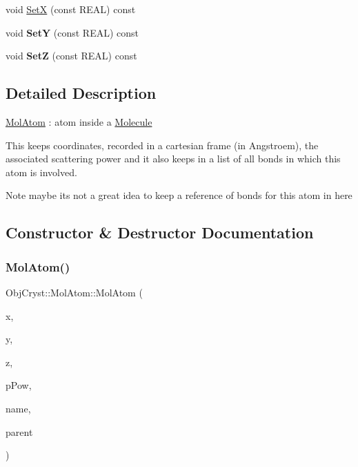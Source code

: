 \begin{DoxyCompactItemize}
\item 
void \mbox{\hyperlink{class_obj_cryst_1_1_mol_atom_a95340ae3d8e3d061a9c28911d471912d}{SetX}} (const R\+E\+AL) const
\item 
\mbox{\label{class_obj_cryst_1_1_mol_atom_a80d9c41c4a6de3a14a02f5f8337df8ad}} 
void {\bfseries SetY} (const R\+E\+AL) const
\item 
\mbox{\label{class_obj_cryst_1_1_mol_atom_aa2299a9315633ee287eac6ae2f953c86}} 
void {\bfseries SetZ} (const R\+E\+AL) const
\end{DoxyCompactItemize}



\subsection{Detailed Description}
\mbox{\hyperlink{class_obj_cryst_1_1_mol_atom}{Mol\+Atom}} \+: atom inside a \mbox{\hyperlink{class_obj_cryst_1_1_molecule}{Molecule}}

This keeps coordinates, recorded in a cartesian frame (in Angstroem), the associated scattering power and it also keeps in a list of all bonds in which this atom is involved.

\begin{DoxyNote}{Note}
maybe it\textquotesingle{}s not a great idea to keep a reference of bonds for this atom in here 
\end{DoxyNote}


\subsection{Constructor \& Destructor Documentation}
\mbox{\label{class_obj_cryst_1_1_mol_atom_a4a96ce5bd91d7b46e53fe8bbc95fa243}} 
\subsubsection{\texorpdfstring{MolAtom()}{MolAtom()}}
{\footnotesize\ttfamily Obj\+Cryst\+::\+Mol\+Atom\+::\+Mol\+Atom (\begin{DoxyParamCaption}\item[{const R\+E\+AL}]{x,  }\item[{const R\+E\+AL}]{y,  }\item[{const R\+E\+AL}]{z,  }\item[{const \mbox{\hyperlink{class_obj_cryst_1_1_scattering_power}{Scattering\+Power}} $\ast$}]{p\+Pow,  }\item[{const string \&}]{name,  }\item[{\mbox{\hyperlink{class_obj_cryst_1_1_molecule}{Molecule}} \&}]{parent }\end{DoxyParamCaption})}

